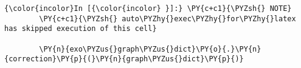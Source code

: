     \begin{Verbatim}[commandchars=\\\{\}]
{\color{incolor}In [{\color{incolor} }]:} \PY{c+c1}{\PYZsh{} NOTE}
        \PY{c+c1}{\PYZsh{} auto\PYZhy{}exec\PYZhy{}for\PYZhy{}latex has skipped execution of this cell}
        
        \PY{n}{exo\PYZus{}graph\PYZus{}dict}\PY{o}{.}\PY{n}{correction}\PY{p}{(}\PY{n}{graph\PYZus{}dict}\PY{p}{)}
\end{Verbatim}



    
    
    
